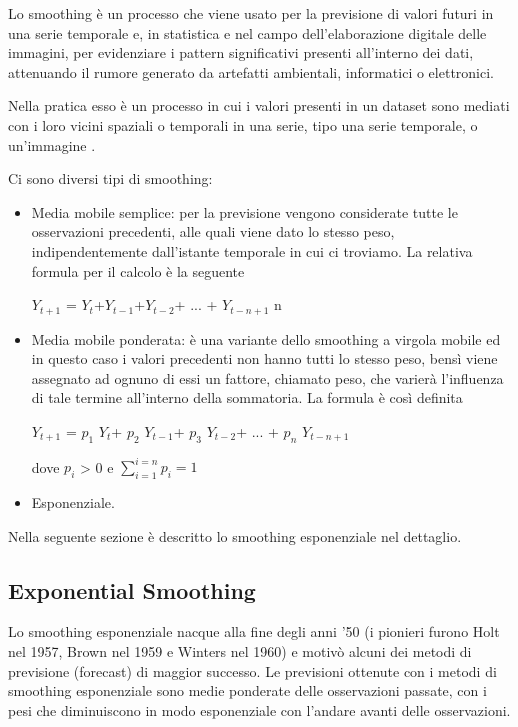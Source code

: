 \documentclass[12pt,a4paper,oneside,openright]{book}
\begin{document}
Lo smoothing è un processo che viene usato per la previsione di valori futuri in una serie temporale e, in statistica e nel campo dell'elaborazione digitale delle immagini, per evidenziare i pattern significativi presenti all'interno dei dati, attenuando il rumore generato da artefatti ambientali, informatici o elettronici. 

Nella pratica esso è un processo in cui i valori presenti in un dataset sono mediati con i loro vicini spaziali o temporali in una serie, tipo una serie temporale, o un'immagine \cite{6a}. 

Ci sono diversi tipi di smoothing:
\begin{itemize}
\item Media mobile semplice: per la previsione vengono considerate tutte le osservazioni precedenti, alle quali viene dato lo stesso peso, indipendentemente dall'istante temporale in cui ci troviamo. La relativa formula per il calcolo è la seguente

\begin{center}
$Y_{t+1}$ = $Y_{t}$+$Y_{t-1}$+$Y_{t-2}$+ ... + $Y_{t-n+1}$ n
\end{center}

\item Media mobile ponderata: è una variante dello smoothing a virgola mobile ed in questo caso i valori precedenti non hanno tutti lo stesso peso, bensì viene assegnato ad ognuno di essi un fattore, chiamato peso, che varierà l'influenza di tale termine all'interno della sommatoria. La formula è così definita

\begin{center}
$Y_{t+1}$ = $p_{1}$ $Y_{t}$+ $p_{2}$ $Y_{t-1}$+ $p_{3}$ $Y_{t-2}$+ ... + $p_{n}$ $Y_{t-n+1}$
\end{center}

dove 
$p_{{i}}$ > {0} e $\sum_{i=1}^{i={n}}{ p_{{i}}} = {1}$


\item Esponenziale.
\end{itemize}

Nella seguente sezione è descritto lo smoothing esponenziale nel dettaglio.
\newpage
\subsection{Exponential Smoothing}
Lo smoothing esponenziale nacque alla fine degli anni '50 (i pionieri furono Holt nel 1957, Brown nel 1959 e Winters nel 1960) e motivò alcuni dei metodi di previsione (forecast) di maggior successo. Le previsioni ottenute con i metodi di smoothing esponenziale sono medie ponderate delle osservazioni passate, con i pesi che diminuiscono in modo esponenziale con l'andare avanti delle osservazioni. 
\end{document}
